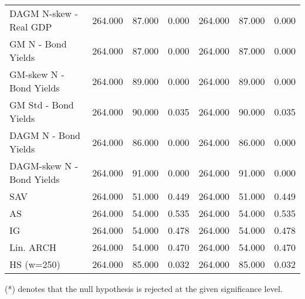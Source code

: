 \documentclass{article}
\begin{document}
\begin{table}[ht]
\begin{tabular}{|l|lll|lll|}
DAGM N-skew - Real GDP & 264.000 & 87.000 & 0.000  & 264.000 & 87.000 & 0.000 \\
GM N - Bond Yields & 264.000 & 87.000 & 0.000  & 264.000 & 87.000 & 0.000 \\ 
GM-skew N - Bond Yields & 264.000 & 89.000 & 0.000  & 264.000 & 89.000 & 0.000 \\
GM Std - Bond Yields & 264.000 & 90.000 & 0.035  & 264.000 & 90.000 & 0.035 \\
DAGM N - Bond Yields & 264.000 & 86.000 & 0.000  & 264.000 & 86.000 & 0.000 \\
DAGM-skew N - Bond Yields & 264.000 & 91.000 & 0.000 & 264.000 & 91.000 & 0.000 \\
\hline
SAV & 264.000 & 51.000 & 0.449  & 264.000 & 51.000 & 0.449 \\
AS & 264.000 & 54.000 & 0.535  & 264.000 & 54.000 & 0.535 \\ 
IG & 264.000 & 54.000 & 0.478 & 264.000 & 54.000 & 0.478 \\ 
Lin. ARCH & 264.000 & 54.000 & 0.470 & 264.000 & 54.000 & 0.470 \\ 
\hline
HS (w=250) & 264.000 & 85.000 & 0.032  & 264.000 & 85.000 & 0.032 \\ 
\hline
\end{tabular}
\end{table}
(*) denotes that the null hypothesis is rejected at the given significance level.
\end{document}
